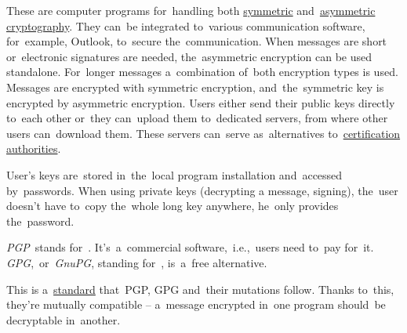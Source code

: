 \label{pgpgpg}
These are computer programs for~handling both \hyperref[symmetriccryptography]{symmetric} and~\hyperref[asymmetriccryptography]{asymmetric cryptography}.
They can~be integrated to~various communication software, for~example, Outlook, to~secure the~communication.
When messages are short or~electronic signatures are needed, the~asymmetric encryption can be used standalone.
For~longer messages a~combination of~both encryption types is used.
Messages are encrypted with symmetric encryption, and~the~symmetric key is encrypted by asymmetric encryption.
Users either send their public keys directly to~each other or~they can~upload them to~dedicated servers, from where other users can~download them.
These servers can~serve as~alternatives to~\hyperref[certificationauthority]{certification authorities}.

User's keys are~stored in~the~local program installation and~accessed by~passwords.
When using private keys (decrypting a message, signing), the~user doesn't have to~copy the~whole long key anywhere, he~only provides the~password.

\textit{PGP}~stands for~.
It's~a~commercial software,~i.e.,~users need to~pay for~it.
\mbox{\textit{GPG}, or \textit{GnuPG}}, standing for~, is~a~free alternative.

This is a~\hyperref[protocolstandard]{standard} that~PGP, GPG and~their mutations follow.
Thanks to~this, they're mutually compatible -- a~message encrypted in~one program should~be decryptable in~another.
